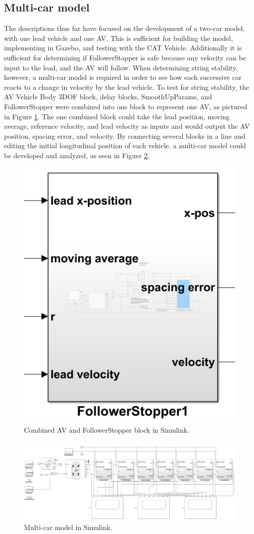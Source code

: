 \documentclass[conference]{IEEEtran}
\begin{document}
\subsection{Multi-car model}
The descriptions thus far have focused on the development of a two-car model, with one lead vehicle and one AV. This is sufficient for building the model, implementing in Gazebo, and testing with the CAT Vehicle. Additionally it is sufficient for determining if FollowerStopper is safe because any velocity can be input to the lead, and the AV will follow. When determining string stability, however, a multi-car model is required in order to see how each successive car reacts to a change in velocity by the lead vehicle. To test for string stability, the AV Vehicle Body 3DOF block, delay blocks, SmoothUpParams, and FollowerStopper were combined into one block to represent one AV, as pictured in Figure \ref{multicarmodel1}. The one combined block could take the lead position, moving average, reference velocity, and lead velocity as inputs and would output the AV position, spacing error, and velocity. By connecting several blocks in a line and editing the initial longitudinal position of each vehicle, a multi-car model could be developed and analyzed, as seen in Figure \ref{multicarmodel2}.

\begin{figure}[htbp]
\centerline{\includegraphics[width=2 in]{7carmodelblock.png}}
\caption{Combined AV and FollowerStopper block in Simulink.}
\label{multicarmodel1}
\end{figure}

\begin{figure}[htbp]
\centerline{\includegraphics[width=3.5 in]{7carmodel.png}}
\caption{Multi-car model in Simulink.}
\label{multicarmodel2}
\end{figure}
\end{document}
